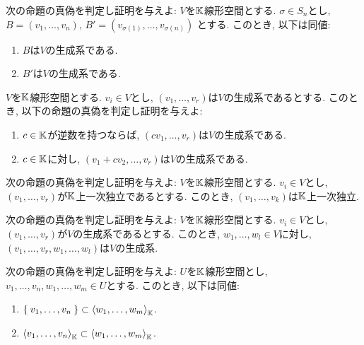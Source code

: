 \begin{quiz}
  次の命題の真偽を判定し証明を与えよ:
  $V$を$\mathbb{K}$線形空間とする.
  $\sigma\in S_n$とし,
  $B=(v_1,\ldots,v_n)$,
  $B'=(v_{\sigma(1)},\ldots,v_{\sigma(n)})$
  とする.
  このとき, 以下は同値:
  \begin{enumerate}
  \item
    $B$は$V$の生成系である.
  \item
    $B'$は$V$の生成系である.
  \end{enumerate}
\end{quiz}

\begin{quiz}
  $V$を$\mathbb{K}$線形空間とする.
  $v_i\in V$とし,
  $(v_1,\ldots, v_r)$は$V$の生成系であるとする.
  このとき,
  以下の命題の真偽を判定し証明を与えよ:
  \begin{enumerate}
  \item
    $c\in\mathbb{K}$が逆数を持つならば,
    $(cv_1,\ldots, v_r)$は$V$の生成系である.
  \item
    $c\in\mathbb{K}$に対し,
    $(v_1+cv_2,\ldots, v_r)$は$V$の生成系である.
  \end{enumerate}
\end{quiz}


\begin{quiz}
  次の命題の真偽を判定し証明を与えよ:
  $V$を$\mathbb{K}$線形空間とする.
  $v_i\in V$とし,
  $(v_1,\ldots, v_r)$が$\mathbb{K}$上一次独立であるとする.
  このとき,
  $(v_{1},\ldots, v_{k})$は$\mathbb{K}$上一次独立.
\end{quiz}



\begin{quiz}
  次の命題の真偽を判定し証明を与えよ:
  $V$を$\mathbb{K}$線形空間とする.
  $v_i\in V$とし,
  $(v_1,\ldots, v_r)$が$V$の生成系であるとする.
  このとき,
  $w_1,\ldots,w_l\in V$に対し,
  $(v_{1},\ldots, v_{r},w_1,\ldots,w_l)$は$V$の生成系.
\end{quiz}

\begin{quiz}
  次の命題の真偽を判定し証明を与えよ:
  $U$を$\mathbb{K}$線形空間とし,
  $v_1,\ldots,v_n,w_1,\ldots,w_m \in U$とする.
  このとき, 以下は同値:  
  \begin{enumerate}
  \item $\Set{v_1,\ldots,v_n}\subset \Braket{w_1,\ldots,w_m}_{\mathbb{K}}$.
  \item $\Braket{v_1,\ldots,v_n}_{\mathbb{K}}\subset \Braket{w_1,\ldots,w_m}_{\mathbb{K}}$.
  \end{enumerate}
\end{quiz}



